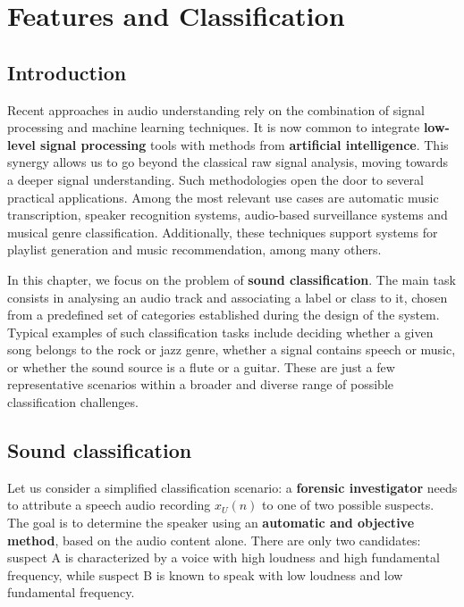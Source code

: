 \section{Features and Classification}

\subsection{Introduction}
Recent approaches in audio understanding rely on the combination of signal processing and machine learning techniques.
It is now common to integrate \textbf{low-level signal processing} tools with methods from \textbf{artificial intelligence}.
This synergy allows us to go beyond the classical raw signal analysis, moving towards a deeper signal understanding.
Such methodologies open the door to several practical applications. Among the most relevant use cases are automatic music transcription, speaker recognition systems, audio-based surveillance systems and musical genre classification.
Additionally, these techniques support systems for playlist generation and music recommendation, among many others.

In this chapter, we focus on the problem of \textbf{sound classification}.
The main task consists in analysing an audio track and associating a label or class to it, chosen from a predefined set of categories established during the design of the system.
Typical examples of such classification tasks include deciding whether a given song belongs to the rock or jazz genre, whether a signal contains speech or music, or whether the sound source is a flute or a guitar.
These are just a few representative scenarios within a broader and diverse range of possible classification challenges.

\subsection{Sound classification}
Let us consider a simplified classification scenario: a \textbf{forensic investigator} needs to attribute a speech audio recording $x_U(n)$ to one of two possible suspects.
The goal is to determine the speaker using an \textbf{automatic and objective method}, based on the audio content alone.
There are only two candidates: suspect A is characterized by a voice with high loudness and high fundamental frequency, while suspect B is known to speak with low loudness and low fundamental frequency.

